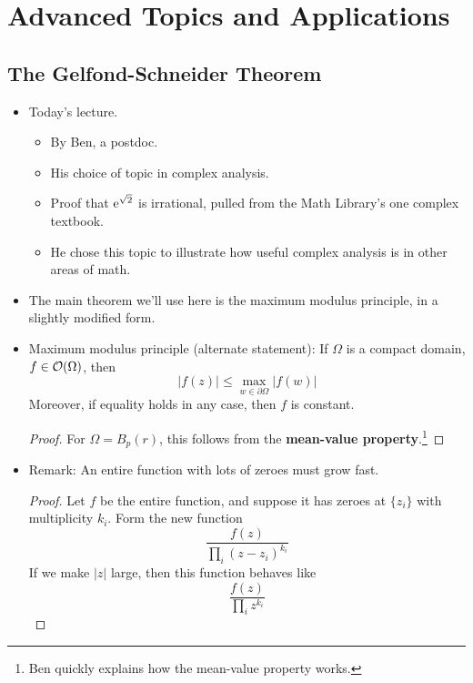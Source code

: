 \documentclass[../notes.tex]{subfiles}
\begin{document}
\chapter{Advanced Topics and Applications}
\section{The Gelfond-Schneider Theorem}
\begin{itemize}
    \item {}Today's lecture.
    \begin{itemize}
        \item By Ben, a postdoc.
        \item His choice of topic in complex analysis.
        \item Proof that $\e[\sqrt{2}]$ is irrational, pulled from the Math Library's one complex textbook.
        \item He chose this topic to illustrate how useful complex analysis is in other areas of math.
    \end{itemize}
    \item The main theorem we'll use here is the maximum modulus principle, in a slightly modified form.
    \item Maximum modulus principle (alternate statement): If $\Omega$ is a compact domain, $f\in\mO(\Omega)$, then
    \begin{equation*}
        |f(z)| \leq \max_{w\in\partial\Omega}|f(w)|
    \end{equation*}
    Moreover, if equality holds in any case, then $f$ is constant.
    \begin{proof}
        For $\Omega=B_p(r)$, this follows from the \textbf{mean-value property}.\footnote{Ben quickly explains how the mean-value property works.}
    \end{proof}
    \item Remark: An entire function with lots of zeroes must grow fast.
    \begin{proof}
        Let $f$ be the entire function, and suppose it has zeroes at $\{z_i\}$ with multiplicity $k_i$. Form the new function
        \begin{equation*}
            \frac{f(z)}{\prod_i(z-z_i)^{k_i}}
        \end{equation*}
        If we make $|z|$ large, then this function behaves like
        \begin{equation*}
            \frac{f(z)}{\prod_iz^{k_i}}
        \end{equation*}

\end{proof}
\end{itemize}
\end{document}
